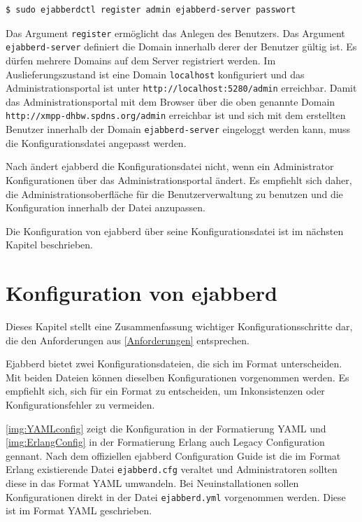 \documentclass[a4paper,titlepage,halfparskip,12pt]{scrreprt}
\begin{document}
\begin{onehalfspacing}
\bigskip

\begin{lstlisting}[language=bash, caption={Anlegen eines Benutzers für die Verwaltung von ejabberd},label={lst:AddAdminUserEjabberd}]
$ sudo ejabberdctl register admin ejabberd-server passwort
\end{lstlisting}

Das Argument \texttt{register} ermöglicht das Anlegen des Benutzers. Das Argument \texttt{ejabberd-server} definiert die Domain innerhalb derer der Benutzer gültig ist. Es dürfen mehrere Domains auf dem Server registriert werden. Im Auslieferungszustand ist eine Domain \texttt{localhost} konfiguriert und das Administrationsportal ist unter \texttt{http://localhost:5280/admin} erreichbar. Damit das Administrationsportal mit dem Browser über die oben genannte Domain \texttt{http://xmpp-dhbw.spdns.org/admin} erreichbar ist und sich mit dem erstellten Benutzer innerhalb der Domain \texttt{ejabberd-server} eingeloggt werden kann, muss die Konfigurationsdatei angepasst werden.\cite{ejabberdMGMT}

Nach \cite{ejabberdDoc} ändert ejabberd die Konfigurationsdatei nicht, wenn ein Administrator Konfigurationen über das Administrationsportal ändert. Es empfiehlt sich daher, die Administrationsoberfläche für die Benutzerverwaltung zu benutzen und die Konfiguration innerhalb der Datei anzupassen.

Die Konfiguration von ejabberd über seine Konfigurationsdatei ist im nächsten Kapitel beschrieben.


\section{Konfiguration von ejabberd}
\label{sec:Konfiguration}

Dieses Kapitel stellt eine Zusammenfassung wichtiger Konfigurationsschritte dar, die den Anforderungen aus \autoref{Anforderungen} entsprechen.

Ejabberd bietet zwei Konfigurationsdateien, die sich im Format unterscheiden. Mit beiden Dateien können dieselben Konfigurationen vorgenommen werden. Es empfiehlt sich, sich für ein Format zu entscheiden, um Inkonsistenzen oder Konfigurationsfehler zu vermeiden.

\autoref{img:YAMLconfig} zeigt die Konfiguration in der Formatierung \ac{YAML} und \autoref{img:ErlangConfig} in der Formatierung Erlang auch Legacy Configuration gennant. Nach dem offiziellen ejabberd Configuration Guide \cite{ejabberdDoc} ist die im Format Erlang existierende Datei \texttt{ejabberd.cfg} veraltet und Administratoren sollten diese in das Format \ac{YAML} umwandeln. Bei Neuinstallationen sollen Konfigurationen direkt in der Datei \texttt{ejabberd.yml} vorgenommen werden. Diese ist im Format \ac{YAML} geschrieben.


\end{onehalfspacing}
\end{document}

